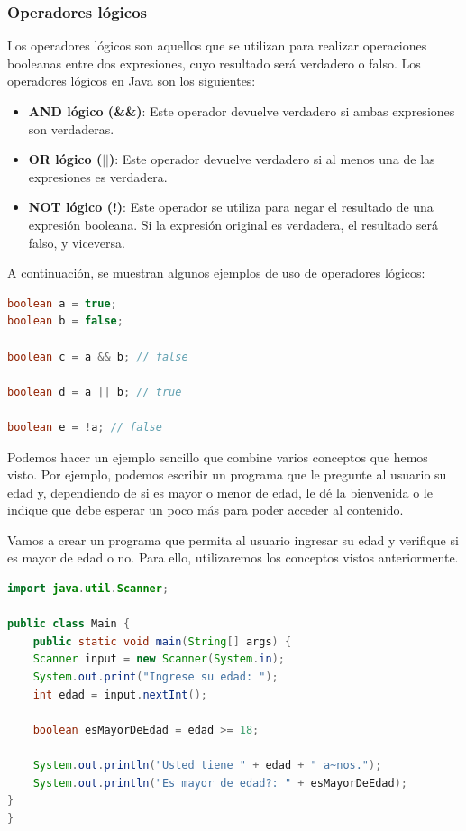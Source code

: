 \documentclass[executivepaper]{article}
\begin{document}
\subsubsection*{Operadores lógicos}

Los operadores lógicos son aquellos que se utilizan para realizar operaciones booleanas entre dos expresiones, cuyo resultado será verdadero o falso. Los operadores lógicos en Java son los siguientes:

\begin{itemize}
\item \textbf{AND lógico (\&\&)}: Este operador devuelve verdadero si ambas expresiones son verdaderas.
\item \textbf{OR lógico ($||$)}: Este operador devuelve verdadero si al menos una de las expresiones es verdadera.
\item \textbf{NOT lógico (!)}: Este operador se utiliza para negar el resultado de una expresión booleana. Si la expresión original es verdadera, el resultado será falso, y viceversa.
\end{itemize}

A continuación, se muestran algunos ejemplos de uso de operadores lógicos:

\begin{lstlisting}[language=Java]
boolean a = true;
boolean b = false;

boolean c = a && b; // false

boolean d = a || b; // true

boolean e = !a; // false
\end{lstlisting}


Podemos hacer un ejemplo sencillo que combine varios conceptos que hemos visto. Por ejemplo, podemos escribir un programa que le pregunte al usuario su edad y, dependiendo de si es mayor o menor de edad, le dé la bienvenida o le indique que debe esperar un poco más para poder acceder al contenido.

Vamos a crear un programa que permita al usuario ingresar su edad y verifique si es mayor de edad o no. Para ello, utilizaremos los conceptos vistos anteriormente.

\begin{lstlisting}[language=Java]
import java.util.Scanner;
    
public class Main {
    public static void main(String[] args) {
    Scanner input = new Scanner(System.in);
    System.out.print("Ingrese su edad: ");
    int edad = input.nextInt();

    boolean esMayorDeEdad = edad >= 18;

    System.out.println("Usted tiene " + edad + " a~nos.");
    System.out.println("Es mayor de edad?: " + esMayorDeEdad);
}
}
\end{lstlisting}
\end{document}
